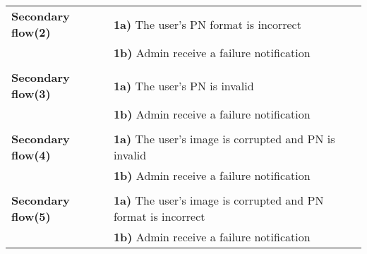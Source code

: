 \documentclass[a4paper,11pt]{article}
\begin{document}
\begin{tabular}{|p{3.5cm}|p{11.5cm}|}
    \\ \hline \rowcolor{Gray} & \\ \hline 
     
    \textbf{Secondary flow(2)} & 
    \textbf{1a)} The user's PN format is incorrect \\&
    \textbf{1b)} Admin receive a failure notification
    
   \\ \hline \rowcolor{Gray} & \\ \hline
    
    \textbf{Secondary flow(3)} & 
    \textbf{1a)} The user's PN is invalid \\&
    \textbf{1b)} Admin receive a failure notification
    
    \\ \hline \rowcolor{Gray} & \\ \hline
    
    \textbf{Secondary flow(4)} & 
    \textbf{1a)} The user's image is corrupted and PN is invalid\\&
    \textbf{1b)} Admin receive a failure notification
    
    \\ \hline \rowcolor{Gray} & \\ \hline
    
    \textbf{Secondary flow(5)} & 
    \textbf{1a)} The user's image is corrupted and PN format is incorrect\\&
    \textbf{1b)} Admin receive a failure notification
    \\\hline 
\end{tabular}


\newpage
\noindent
\end{document}
